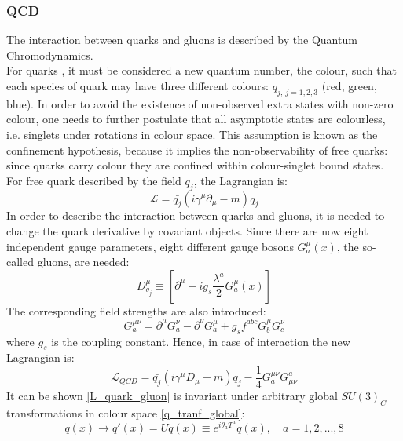 \subsubsection{QCD}\label{QCD}
The interaction between quarks and gluons is described by the Quantum Chromodynamics. \\
For quarks \cite{QCD}, it must be considered a new quantum number, the colour, such that each species of quark may have three different colours: $q_{j,\ j = 1, 2, 3}$ (red, green, blue). In order to avoid the existence of non-observed extra states with non-zero colour, one needs to further postulate that all asymptotic states are colourless, i.e. singlets under rotations in colour space. This assumption is known as the confinement hypothesis, because it implies the non-observability of free quarks: since quarks carry colour they are confined within colour-singlet bound states. \\
For free quark described by the field $q_{j}$, the Lagrangian is:
\begin{equation}
\mathcal{L} = \bar{q_{j}}(i\gamma^{\mu}\partial_{\mu} - m)q_{j}
\label{L_quark}
\end{equation}
In order to describe the  interaction between quarks and gluons, it is needed to change the quark derivative by covariant objects. Since there are now eight independent gauge parameters, eight different gauge bosons $G^{\mu}_{a}(x)$, the so-called gluons, are needed:
\begin{equation}
D^{\mu}_{q_{j}} \equiv [\partial^{\mu}- ig_{s}\frac{\lambda^{a}}{2}G^{\mu}_{a}(x)]
\label{D_covariante_qcd}
\end{equation}
The corresponding field strengths are also introduced:
\begin{equation}
G^{\mu\nu}_{a} = \partial^{\mu}G^{\nu}_{a} - \partial^{\nu}G^{\mu}_{a} + g_{s}f^{abc}G^{\mu}_{b}G^{\nu}_{c}
\label{G_munu}
\end{equation}
where $g_{s}$ is the coupling constant.
Hence, in case of interaction the new Lagrangian is:
\begin{equation}
\mathcal{L}_{QCD} = \bar{q_{j}}(i\gamma^{\mu}D_{\mu} - m)q_{j} -\frac{1}{4}G^{\mu\nu}_{a}G^{a}_{\mu\nu}
\label{L_quark_gluon}
\end{equation}
It can be shown \ref{L_quark_gluon} is invariant under arbitrary global $SU(3)_{C}$ transformations in colour space \ref{q_tranf_global}:
\begin{equation}
q(x) \to q'(x) = Uq(x) \equiv e^{i\theta_{a}T^{a}}q(x), \quad a = 1, 2, ...,8
\label{q_tranf_global}
\end{equation}
